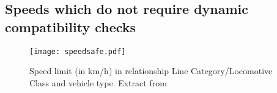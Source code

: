 \begin{appendices}











%  



\chapter{Speeds which do not require dynamic compatibility checks} \label{app:speedsafe}

\begin{figure}[h]
    \centering
    \texttt{[image: speedsafe.pdf]}
    \caption{Speed limit (in km/h) in relationship Line Category/Locomotive Class and vehicle type. Extract from \citet[Appendix F]{EC15528}}
\end{figure}



\end{appendices}
